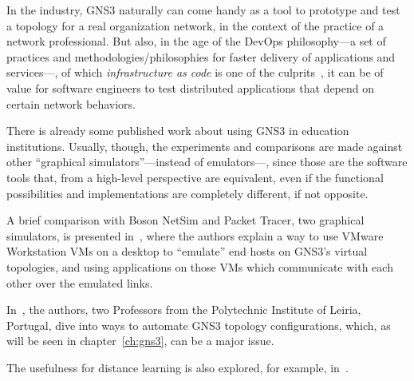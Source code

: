 In the industry, GNS3 naturally can come handy as a tool to prototype and test a topology for a real organization network, in the context of the practice of a network professional.
But also, in the age of the DevOps philosophy---a set of practices and methodologies/philosophies for faster delivery of applications and services---, of which \emph{infrastructure as code} is one of the culprits~\cite{awswhatisdevops}, it can be of value for software engineers to test distributed applications that depend on certain network behaviors.


There is already some published work about using GNS3 in education institutions.
Usually, though, the experiments and comparisons are made against other ``graphical simulators''---instead of emulators---, since those are the software tools that, from a high-level perspective are equivalent, even if the functional possibilities and implementations are completely different, if not opposite.

A brief comparison with Boson NetSim and Packet Tracer, two graphical simulators, is presented in~\cite{virtlabgnsvmware}, where the authors explain a way to use VMware Workstation VMs on a desktop to ``emulate'' end hosts on GNS3's virtual topologies, and using applications on those VMs which communicate with each other over the emulated links.

In~\cite{automaticnetconfiggns}, the authors, two Professors from the Polytechnic Institute of Leiria, Portugal, dive into ways to automate GNS3 topology configurations, which, as will be seen in chapter~\ref{ch:gns3}, can be a major issue. %

The usefulness for distance learning is also explored, for example, in~\cite{networkvirtwithgns}.

